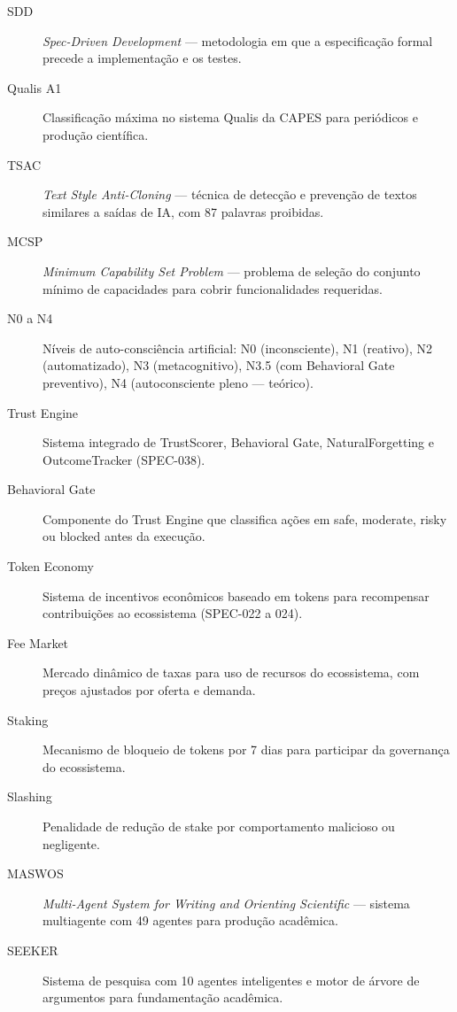 \begin{description}
\item[SDD] \emph{Spec-Driven Development} --- metodologia em que a
especificação formal precede a implementação e os testes.

\item[Qualis A1] Classificação máxima no sistema Qualis da CAPES para
periódicos e produção científica.

\item[TSAC] \emph{Text Style Anti-Cloning} --- técnica de detecção e
prevenção de textos similares a saídas de IA, com 87 palavras proibidas.

\item[MCSP] \emph{Minimum Capability Set Problem} --- problema de seleção
do conjunto mínimo de capacidades para cobrir funcionalidades requeridas.

\item[N0 a N4] Níveis de auto-consciência artificial: N0 (inconsciente),
N1 (reativo), N2 (automatizado), N3 (metacognitivo), N3.5 (com Behavioral
Gate preventivo), N4 (autoconsciente pleno --- teórico).

\item[Trust Engine] Sistema integrado de TrustScorer, Behavioral Gate,
NaturalForgetting e OutcomeTracker (SPEC-038).

\item[Behavioral Gate] Componente do Trust Engine que classifica ações em
safe, moderate, risky ou blocked antes da execução.

\item[Token Economy] Sistema de incentivos econômicos baseado em tokens
para recompensar contribuições ao ecossistema (SPEC-022 a 024).

\item[Fee Market] Mercado dinâmico de taxas para uso de recursos do
ecossistema, com preços ajustados por oferta e demanda.

\item[Staking] Mecanismo de bloqueio de tokens por 7 dias para participar
da governança do ecossistema.

\item[Slashing] Penalidade de redução de stake por comportamento malicioso
ou negligente.

\item[MASWOS] \emph{Multi-Agent System for Writing and Orienting Scientific}
--- sistema multiagente com 49 agentes para produção acadêmica.

\item[SEEKER] Sistema de pesquisa com 10 agentes inteligentes e motor de
árvore de argumentos para fundamentação acadêmica.


\end{description}
